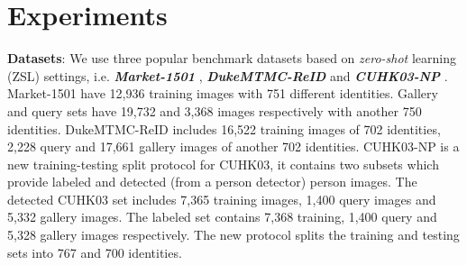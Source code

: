 \documentclass[10pt,twocolumn,letterpaper]{article}
\begin{document}
\section{Experiments}\label{sec_experiments}
\textbf{Datasets}: We use three popular benchmark datasets based on \emph{zero-shot} learning (ZSL) settings, i.e. \emph{\textbf{Market-1501}} \cite{zheng2015scalable}, \emph{\textbf{DukeMTMC-ReID}} \cite{ristani2016performance,zheng2017unlabeled} and \emph{\textbf{CUHK03-NP}} \cite{li2014deepreid,zhong2017re}. Market-1501 have 12,936 training images with 751 different identities. Gallery and query sets have 19,732 and 3,368 images respectively with another 750 identities. DukeMTMC-ReID includes 16,522 training images of 702 identities, 2,228 query and 17,661 gallery images of another 702 identities. CUHK03-NP is a new training-testing split protocol for CUHK03, it contains two subsets which provide labeled and detected (from a person detector) person images. The detected CUHK03 set includes 7,365 training images, 1,400 query images and 5,332 gallery images. The labeled set contains 7,368 training, 1,400 query and 5,328 gallery images respectively. The new protocol splits the training and testing sets into 767 and 700 identities.
\end{document}
